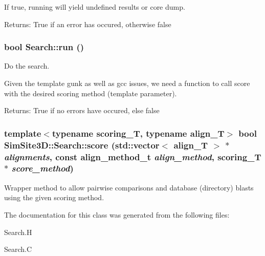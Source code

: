 If true, running will yield undefined results or core dump. 

\begin{Desc}
\item[Returns:]True if an error has occured, otherwise false \end{Desc}
\subsubsection{\setlength{\rightskip}{0pt plus 5cm}bool Search::run ()}\label{classSimSite3D_1_1Search_051f1638b64fb50b60b1b6dd5f10305e}


Do the search. 

Given the template gunk as well as gcc issues, we need a function to call score with the desired scoring method (template parameter).

\begin{Desc}
\item[Returns:]True if no errors have occured, else false \end{Desc}
\subsubsection{\setlength{\rightskip}{0pt plus 5cm}template$<$typename scoring\_\-T, typename align\_\-T$>$ bool SimSite3D::Search::score (std::vector$<$ align\_\-T $>$ $\ast$ {\em alignments}, const align\_\-method\_\-t {\em align\_\-method}, scoring\_\-T $\ast$ {\em score\_\-method})\hspace{0.3cm}{\tt  [inline, protected]}}\label{classSimSite3D_1_1Search_1da1018845426f8b1ebfcf3388d6dbed}


Wrapper method to allow pairwise comparisons and database (directory) blasts using the given scoring method. 

The documentation for this class was generated from the following files:\begin{CompactItemize}
\item 
Search.H\item 
Search.C\end{CompactItemize}
